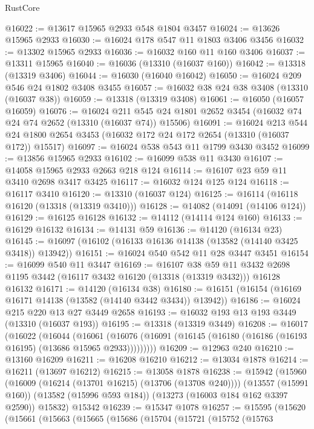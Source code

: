 \begin{lexlean}{RustCore}
\begin{coremodule}
@16022 := @13617 @15965 @2933 @548 @1804 @3457
@16024 := @13626 @15965 @2933
@16030 := @16024 @178 @547 @11 @1803 @3406 @3456
@16032 := @13302 @15965 @2933
@16036 := @16032 @160 @11 @160 @3406
@16037 := @13311 @15965
@16040 := @16036 (@13310 (@16037 @160))
@16042 := @13318 (@13319 @3406)
@16044 := @16030 (@16040 @16042)
@16050 := @16024 @209 @546 @24 @1802 @3408 @3455
@16057 := @16032 @38 @24 @38 @3408 (@13310 (@16037 @38))
@16059 := @13318 (@13319 @3408)
@16061 := @16050 (@16057 @16059)
@16076 := @16024
    @211
    @545
    @24
    @1801
    @2652
    @3454
    (@16032 @74 @24 @74 @2652 (@13310 (@16037 @74)) @15506)
@16091 := @16024
    @213
    @544
    @24
    @1800
    @2654
    @3453
    (@16032 @172 @24 @172 @2654 (@13310 (@16037 @172)) @15517)
@16097 := @16024 @538 @543 @11 @1799 @3430 @3452
@16099 := @13856 @15965 @2933
@16102 := @16099 @538 @11 @3430
@16107 := @14058 @15965 @2933 @2663 @218 @124
@16114 := @16107 @23 @59 @11 @3410 @2698 @3417 @3425
@16117 := @16032 @124 @125 @124
@16118 := @16117 @3410
@16120 := @13310 (@16037 @124)
@16125 := @16114 (@16118 @16120 (@13318 (@13319 @3410)))
@16128 := @14082 (@14091 (@14106 @124))
@16129 := @16125 @16128
@16132 := @14112 (@14114 @124 @160)
@16133 := @16129 @16132
@16134 := @14131 @59
@16136 := @14120 (@16134 @23)
@16145 := @16097 (@16102 (@16133 @16136 @14138 (@13582 (@14140 @3425 @3418)) @13942))
@16151 := @16024 @540 @542 @11 @28 @3447 @3451
@16154 := @16099 @540 @11 @3447
@16169 := @16107
    @38
    @59
    @11
    @3432
    @2698
    @1195
    @3442
    (@16117 @3432 @16120 (@13318 (@13319 @3432)))
    @16128
    @16132
@16171 := @14120 (@16134 @38)
@16180 := @16151 (@16154 (@16169 @16171 @14138 (@13582 (@14140 @3442 @3434)) @13942))
@16186 := @16024 @215 @220 @13 @27 @3449 @2658
@16193 := @16032 @193 @13 @193 @3449 (@13310 (@16037 @193))
@16195 := @13318 (@13319 @3449)
@16208 := @16017
    (@16022
      (@16044
        (@16061
          (@16076 (@16091 (@16145 (@16180 (@16186 (@16193 @16195) (@13686 @15965 @2933)))))))))
@16209 := @12963 @240
@16210 := @13160 @16209
@16211 := @16208 @16210
@16212 := @13034 @1878
@16214 := @16211 (@13697 @16212)
@16215 := @13058 @1878
@16238 := @15942
    (@15960
      (@16009 (@16214 (@13701 @16215) (@13706 (@13708 @240))))
      (@13557 (@15991 @160))
      (@13582 (@15996 @593 @184))
      (@13273 (@16003 @184 @162 @3397 @2590))
      @15832)
    @15342
@16239 := @15347 @1078
@16257 := @15595
    (@15620
      (@15661
        (@15663
          (@15665
            (@15686
              (@15704
                (@15721
                  (@15752
                    (@15763

\end{coremodule}
\end{lexlean}
